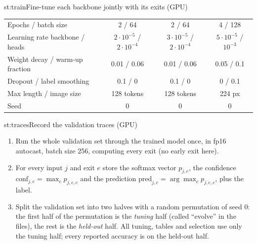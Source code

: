 \begin{step}{st:train}{Fine-tune each backbone jointly with its exits (GPU)}
\begin{center}
\begin{tabular}{@{}lccc@{}}
  Epochs / batch size & 2 / 64 & 2 / 64 & 4 / 128 \\
  Learning rate backbone / heads & $2\cdot10^{-5}$ / $2\cdot10^{-4}$ & $3\cdot10^{-5}$ / $2\cdot10^{-4}$ & $5\cdot10^{-5}$ / $10^{-3}$ \\
  Weight decay / warm-up fraction & 0.01 / 0.06 & 0.01 / 0.06 & 0.05 / 0.1 \\
  Dropout / label smoothing & 0.1 / 0 & 0.1 / 0 & 0 / 0.1 \\
  Max length / image size & 128 tokens & 128 tokens & 224 px \\
  Seed & 0 & 0 & 0 \\
  \bottomrule
\end{tabular}
\end{center}
\end{step}

\begin{step}{st:traces}{Record the validation traces (GPU)}
\begin{enumerate}
  \item Run the whole validation set through the trained model once, in fp16 autocast, batch size 256, computing
  every exit (no early exit here).
  \item For every input $j$ and exit $e$ store the softmax vector $p_{j,e}$, the confidence
  $\text{conf}_{j,e}=\max_c p_{j,e,c}$ and the prediction $\text{pred}_{j,e}=\arg\max_c p_{j,e,c}$, plus the label.
  \item Split the validation set into two halves with a random permutation of seed 0: the first half of the
  permutation is the \emph{tuning} half (called ``evolve'' in the files), the rest is the \emph{held-out} half. All
  tuning, tables and selection use only the tuning half; every reported accuracy is on the held-out half.
\end{enumerate}
\end{step}

